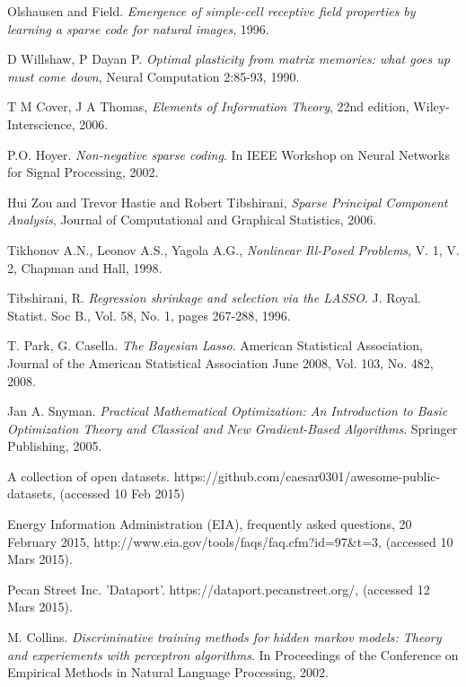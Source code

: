 \begin{thebibliography}{9}
Olshausen and Field. \emph{Emergence of simple-cell receptive field properties by learning a sparse code for natural images}, 1996.

D Willshaw, P Dayan P. \emph{Optimal plasticity from matrix memories: what goes up must come down}, 
Neural Computation 2:85-93, 1990.

T M Cover, J A Thomas, \emph{Elements of Information Theory}, 22nd edition, Wiley-Interscience, 2006.

P.O. Hoyer. \emph{Non-negative sparse coding}. 
In IEEE Workshop on Neural Networks for Signal Processing, 2002.

Hui Zou and Trevor Hastie and Robert Tibshirani, \emph{Sparse Principal Component Analysis}, 
Journal of Computational and Graphical Statistics, 2006.

Tikhonov A.N., Leonov A.S., Yagola A.G., \emph{Nonlinear Ill-Posed Problems}, V. 1, V. 2, Chapman and Hall, 1998.

Tibshirani, R. \emph{Regression shrinkage and selection via the LASSO}. J. Royal. Statist. Soc B., Vol. 58, No. 1, pages 267-288, 1996.

T. Park, G. Casella. \emph{The Bayesian Lasso}. American Statistical Association, Journal of the American Statistical Association
June 2008, Vol. 103, No. 482, 2008.

Jan A. Snyman. \emph{Practical Mathematical Optimization: An Introduction to Basic Optimization Theory and Classical and New Gradient-Based Algorithms}. Springer Publishing, 2005.


A collection of open datasets. https://github.com/caesar0301/awesome-public-datasets, (accessed 10 Feb 2015)

Energy Information Administration (EIA), frequently asked questions, 20 February 2015,
http://www.eia.gov/tools/faqs/faq.cfm?id=97\&t=3, (accessed 10 Mars 2015).

Pecan Street Inc. 'Dataport'. https://dataport.pecanstreet.org/, (accessed 12 Mars 2015).

M. Collins. \emph{Discriminative training methods for hidden markov models: Theory and experiements with perceptron algorithms}. In Proceedings of the Conference on Empirical Methods in Natural Language Processing, 2002.


\end{thebibliography}
